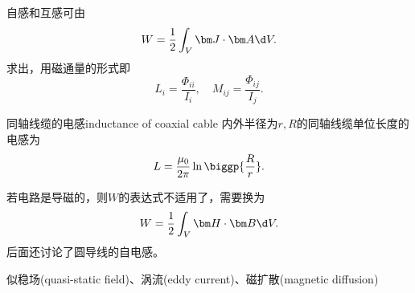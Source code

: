 自感和互感可由
\[
    W=\frac12\int_V\bm J\cdot\bm A\d V.
\]
求出，用磁通量的形式即
\[
    L_i=\frac{\varPhi_{ii}}{I_i},\quad M_{ij}=\frac{\varPhi_{ij}}{I_j}.
\]
\begin{example}
    {同轴线缆的电感}{inductance of coaxial cable}
    内外半径为$r,R$的同轴线缆单位长度的电感为
    \begin{equation}
        L=\frac{\mu_0}{2\pi}\ln\biggp{\frac Rr}.
    \end{equation}
\end{example}
若电路是导磁的，则$W$的表达式不适用了，需要换为
\[
    W=\frac12\int_V\bm H\cdot\bm B\d V.
\]
后面还讨论了圆导线的自电感。

\label{sec:quasi-static field}

似稳场(quasi-static field)、涡流(eddy current)、磁扩散(magnetic diffusion)

